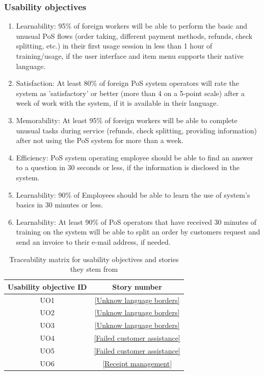\documentclass{article}
\begin{document}
\subsubsection{Usability objectives}
\begin{enumerate}[label=UO\arabic*.]
    \item Learnability: 95\% of foreign workers will be able to perform the basic and unusual PoS flows (order taking, different payment methods, refunds, check splitting, etc.) in their first usage session in less than 1 hour of training/usage, if the user interface and item menu supports their native language.
    \item Satisfaction: At least 80\% of foreign PoS system operators will rate the system as 'satisfactory' or better (more than 4 on a 5-point scale) after a week of work with the system, if it is available in their language.
    \item Memorability: At least 95\% of foreign workers will be able to complete unusual tasks during service (refunds, check splitting, providing information) after not using the PoS system for more than a week.
    \item Efficiency: PoS system operating employee should be able to find an answer to a question in 30 seconds or less, if the information is disclosed in the system.
    \item Learnability: 90\% of Employees should be able to learn the use of system's basics in 30 minutes or less.
    \item Learnability: At least  90\% of PoS operators that have received 30 minutes of training on the system will be able to split an order by customers request and send an invoice to their e-mail address, if needed.
\end{enumerate}

\begin{table}[h]
\centering
\caption{Traceability matrix for usability objectives and stories they stem from}
\begin{tabular}{|c|c|}
\hline
\textbf{Usability objective ID} & \textbf{Story number} \\ \hline
UO1  & \ref{Unknow language borders} \\ \hline
UO2  & \ref{Unknow language borders} \\ \hline
UO3  & \ref{Unknow language borders} \\ \hline
UO4  & \ref{Failed customer assistance} \\ \hline
UO5  & \ref{Failed customer assistance} \\ \hline
UO6  & \ref{Receipt management} \\ \hline
\end{tabular}
\end{table}
\end{document}
